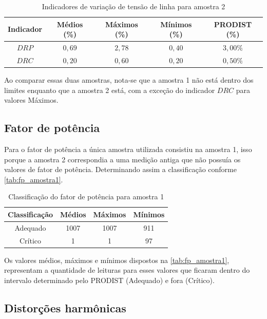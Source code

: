\begin{table}[H]
  \centering
  \caption{Indicadores de variação de tensão de linha para amostra 2}
  \label{tab:vt_linha_a2}
  \begin{tabular}{@{}ccccc@{}}
    \toprule
    \textbf{Indicador} & \textbf{Médios (\%)} & \textbf{Máximos (\%)} & \textbf{Mínimos (\%)} & \textbf{PRODIST (\%)} \\
    \midrule
    $DRP$ & $0,69$ & $2,78$ & $0,40$ & $3,00\%$ \\
    $DRC$ & $0,20$ & $0,60$ & $0,20$ & $0,50\%$ \\
    \bottomrule
  \end{tabular}
\end{table}

Ao comparar essas duas amostras, nota-se que a amostra 1 não está dentro dos limites enquanto que a amostra 2 está, com a exceção do indicador $DRC$ para valores Máximos.

\subsection{Fator de potência}

Para o fator de potência a única amostra utilizada consistiu na amostra 1, isso porque a amostra 2 correspondia a uma medição antiga que não possuía os valores de fator de potência. Determinando assim a classificação conforme \autoref{tab:fp_amostra1}.

\begin{table}[H]
  \centering
  \caption{Classificação do fator de potência para amostra 1}
  \label{tab:fp_amostra1}
  \begin{tabular}{@{}cccc@{}}
    \toprule
    Classificação & Médios & Máximos & Mínimos \\
    \midrule
    Adequado & 1007 & 1007 & 911 \\
    Crítico & 1 & 1 & 97 \\
    \bottomrule
  \end{tabular}
\end{table}

Os valores médios, máximos e mínimos dispostos na \autoref{tab:fp_amostra1}, representam a quantidade de leituras para esses valores que ficaram dentro do intervalo determinado pelo PRODIST (Adequado) e fora (Crítico).

\subsection{Distorções harmônicas}

